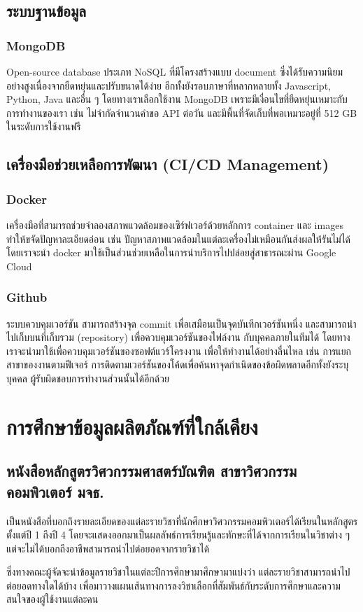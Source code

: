 \subsection{ระบบฐานข้อมูล}
\subsubsection{MongoDB}
Open-source database ประเภท NoSQL ที่มีโครงสร้างแบบ document
ซึ่งได้รับความนิยมอย่างสูงเนื่องจากยืดหยุ่นและปรับขนาดได้ง่าย
อีกทั้งยังรอบภาษาที่หลากหลายทั้ง Javascript, Python, Java และอื่น ๆ
โดยทางเราเลือกใช้งาน MongoDB เพราะมีเงื่อนไขที่ยืดหยุ่นเหมาะกับการทำงานของเรา
เช่น ไม่จำกัดจำนวนคำขอ API ต่อวัน และมีพื้นที่จัดเก็บที่พอเหมาะอยู่ที่ 512 GB
ในระดับการใช้งานฟรี
\subsection{เครื่องมือช่วยเหลือการพัฒนา (CI/CD Management)}
\subsubsection{Docker}
เครื่องมือที่สามารถช่วยจำลองสภาพแวดล้อมของเซิร์ฟเวอร์ด้วยหลักการ container
และ images ทำให้ขจัดปัญหาละเอียดอ่อน เช่น ปัญหาสภาพแวดล้อมในแต่ละเครื่องไม่เหมือนกันส่งผลให้รันไม่ได้ โดยเราจะนำ docker มาใช้เป็นส่วนช่วยเหลือในการนำบริการไปปล่อยสู่สาธารณะผ่าน Google Cloud
\subsubsection{Github}
ระบบควบคุมเวอร์ชัน สามารถสร้างจุด commit เพื่อเสมือนเป็นจุดบันทึกเวอร์ชันหนึ่ง
และสามารถนำไปเก็บบนที่เก็บรวม (repository) เพื่อควบคุมเวอร์ชันของไฟล์งาน
กับบุคคลภายในทีมได้ โดยทางเราจะนำมาใช้เพื่อควบคุมเวอร์ชันของซอฟต์แวร์โครงงาน
เพื่อให้ทำงานได้อย่างลื่นไหล เช่น การแยกสาขาของงานตามฟีเจอร์
การติดตามเวอร์ชันของโค้ดเพื่อค้นหาจุดกำเนิดของข้อผิดพลาดอีกทั้งยังระบุบุคคล
ผู้รับผิดชอบการทำงานส่วนนั้นได้อีกด้วย
\section{การศึกษาข้อมูลผลิตภัณฑ์ที่ใกล้เคียง}
\subsection{หนังสือหลักสูตรวิศวกรรมศาสตร์บัณฑิต สาขาวิศวกรรมคอมพิวเตอร์ มจธ.}
เป็นหนังสือที่บอกถึงรายละเอียดของแต่ละรายวิชาที่นักศึกษาวิศวกรรมคอมพิวเตอร์ได้เรียนในหลักสูตรตั้งแต่ปี 1 ถึงปี 4
โดยจะแสดงออกมาเป็นผลลัพธ์การเรียนรู้และทักษะที่ได้จากการเรียนในวิชาต่าง ๆ แต่จะไม่ได้บอกถึงอาชีพสามารถนำไปต่อยอดจากรายวิชาได้
\par ซึ่งทางคณะผู้จัดจะนำข้อมูลรายวิชาในแต่ละปีการศึกษามาศึกษามาแบ่งว่า แต่ละรายวิชาสามารถนำไปต่อยอดทางใดได้บ้าง
เพื่อมาวางแผนเส้นทางการลงวิชาเลือกที่สัมพันธ์กับระดับการศึกษาและความสนใจของผู้ใช้งานแต่ละคน

